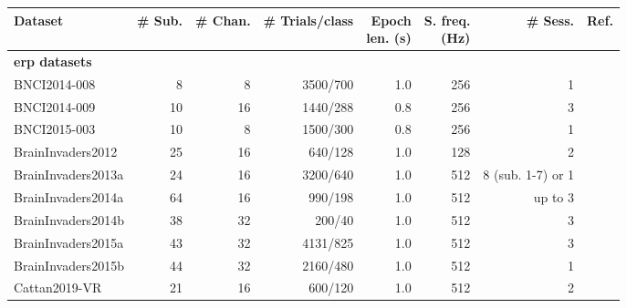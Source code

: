\begin{tabularx}{\linewidth}{@{}Xrrrrrrr@{}}
	\toprule
	Dataset                    & \# Sub.         & \# Chan. & \# Trials/class
	                           & \makecell{Epoch                                                                                          \\ len. (s)} & \makecell{S. freq.\\ (Hz)}
	                           & \# Sess.        & Ref.                                                                                   \\
	\midrule
	\textbf{\Ac{erp} datasets} &                 &          &                 &     &      &                   &                          \\
	BNCI2014-008               & 8               & 8        & 3500/700        & 1.0 & 256  & 1                 & \cite{Riccio2013}        \\
	BNCI2014-009               & 10              & 16       & 1440/288        & 0.8 & 256  & 3                 & \cite{Arico2014}         \\
	BNCI2015-003               & 10              & 8        & 1500/300        & 0.8 & 256  & 1                 & \cite{Guger2009}         \\
	BrainInvaders2012          & 25              & 16       & 640/128         & 1.0 & 128  & 2                 & \cite{VanVeen2019}       \\
	BrainInvaders2013a         & 24              & 16       & 3200/640        & 1.0 & 512  & 8 (sub. 1-7) or 1 & \cite{Vaineau2019}       \\
	BrainInvaders2014a         & 64              & 16       & 990/198         & 1.0 & 512  & up to 3           & \cite{Korczowski2019}    \\
	BrainInvaders2014b         & 38              & 32       & 200/40          & 1.0 & 512  & 3                 & \cite{Korczowski2019a}   \\
	BrainInvaders2015a         & 43              & 32       & 4131/825        & 1.0 & 512  & 3                 & \cite{Korczowski2019b}   \\
	BrainInvaders2015b         & 44              & 32       & 2160/480        & 1.0 & 512  & 1                 & \cite{Korczowski2019c}   \\
	Cattan2019-VR              & 21              & 16       & 600/120         & 1.0 & 512  & 2                 & \cite{Cattan2019}        \\

\end{tabularx}
